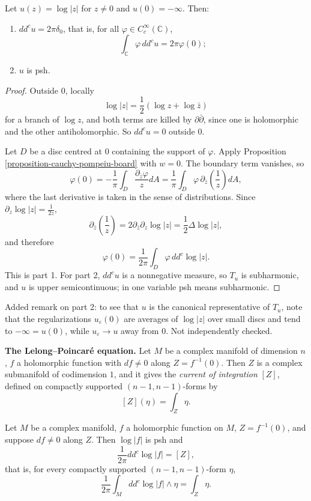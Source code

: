 \begin{proposition}
\label{proposition-log-z-delta}
Let $u(z)=\log|z|$ for $z\neq 0$ and
$u(0)=-\infty$. Then:
\begin{enumerate}
\item $dd^cu=2\pi\delta_0$, that is, for all
$\varphi\in C^\infty_c(\mathbb{C})$,
$$
\int_{\mathbb{C}}\varphi\,dd^cu
=2\pi\varphi(0);
$$
\item $u$ is psh.
\end{enumerate}
\end{proposition}

\begin{proof}
Outside $0$, locally
$$
\log|z|=\frac{1}{2}\left(\log z
+\log\bar z\right)
$$
for a branch of $\log z$, and both terms are
killed by $\partial\bar\partial$, since one
is holomorphic and the other
antiholomorphic. So $dd^cu=0$ outside $0$.

Let $D$ be a disc centred at $0$ containing
the support of $\varphi$. Apply Proposition
\ref{proposition-cauchy-pompeiu-board} with
$w=0$. The boundary term vanishes, so
$$
\varphi(0)=-\frac{1}{\pi}\int_D
\frac{\partial_{\bar z}\varphi}{z}dA
=\frac{1}{\pi}\int_D\varphi\,
\partial_{\bar z}\left(\frac{1}{z}\right)
dA,
$$
where the last derivative is taken in the
sense of distributions. Since
$\partial_z\log|z|=\frac{1}{2z}$,
$$
\partial_{\bar z}\left(\frac{1}{z}\right)
=2\partial_{\bar z}\partial_z\log|z|
=\frac{1}{2}\Delta\log|z|,
$$
and therefore
$$
\varphi(0)=\frac{1}{2\pi}\int_D\varphi\,
dd^c\log|z|.
$$
This is part 1. For part 2, $dd^cu$ is a
nonnegative measure, so $T_u$ is
subharmonic, and $u$ is upper
semicontinuous; in one variable psh means
subharmonic.
\end{proof}

\noindent
Added remark on part 2: to see that $u$ is the
canonical representative of $T_u$, note that
the regularizations $u_\varepsilon(0)$ are
averages of $\log|z|$ over small discs and
tend to $-\infty=u(0)$, while
$u_\varepsilon\to u$ away from $0$. Not
independently checked.

\medskip\noindent
{\bf The Lelong--Poincar\'e equation.} Let
$M$ be a complex manifold of dimension $n$,
$f$ a holomorphic function with $df\neq 0$
along $Z=f^{-1}(0)$. Then $Z$ is a complex
submanifold of codimension $1$, and it gives
the \emph{current of integration} $[Z]$,
defined on compactly supported
$(n-1,n-1)$-forms by
$$
[Z](\eta)=\int_Z\eta.
$$

\begin{theorem}
\label{theorem-lelong-poincare-smooth}
Let $M$ be a complex manifold, $f$ a
holomorphic function on $M$, $Z=f^{-1}(0)$,
and suppose $df\neq 0$ along $Z$. Then
$\log|f|$ is psh and
$$
\frac{1}{2\pi}dd^c\log|f|=[Z],
$$
that is, for every compactly supported
$(n-1,n-1)$-form $\eta$,
$$
\frac{1}{2\pi}\int_M dd^c\log|f|\wedge\eta
=\int_Z\eta.
$$
\end{theorem}

